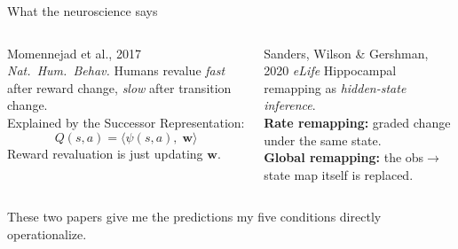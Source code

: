 \documentclass[aspectratio=169]{beamer}
\begin{document}
\begin{frame}{What the neuroscience says}
  \begin{columns}[T]
      \begin{block}{Momennejad et al., 2017 \hfill \emph{Nat.\ Hum.\ Behav.}}
        \footnotesize
        Humans revalue \emph{fast} after reward change, \emph{slow} after transition change.\\[0.3em]
        Explained by the Successor Representation:
        \[ Q(s,a) = \langle \psi(s,a),\; \mathbf{w}\rangle \]
        Reward revaluation is just updating $\mathbf{w}$.
      \end{block}
      \begin{block}{Sanders, Wilson \& Gershman, 2020 \hfill \emph{eLife}}
        \footnotesize
        Hippocampal remapping as \emph{hidden-state inference}.\\[0.3em]
        \textbf{Rate remapping:} graded change under the same state.\\[0.2em]
        \textbf{Global remapping:} the obs$\rightarrow$state map itself is replaced.
      \end{block}
  \end{columns}
  \vspace{0.6em}
  \centerline{\footnotesize These two papers give me the predictions my five conditions directly operationalize.}
\end{frame}
\end{document}
